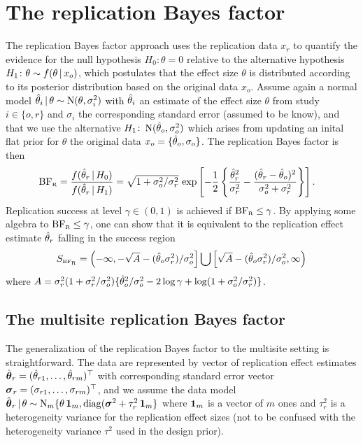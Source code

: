 \documentclass[a4paper, 11pt]{article}
\begin{document}
\section{The replication Bayes factor}
The replication Bayes factor approach uses the replication data $x_{r}$ to
quantify the evidence for the null hypothesis $H_{0}\colon \theta = 0$ relative
to the alternative hypothesis $H_{1} \colon \theta \sim f(\theta \,\vert\, x_{o})$,
which postulates that the effect size $\theta$ is distributed according to its
posterior distribution based on the original data $x_{o}$. Assume again a normal
model $\hat{\theta}_{i} \,\vert\, \theta \sim \operatorname{N}(\theta, \sigma^{2}_{i})$ with
$\hat{\theta}_{i}$ an estimate of the effect size $\theta$ from study $i \in \{o, r\}$
and $\sigma_{i}$ the corresponding standard error (assumed to be know), and that
we use the alternative $H_{1} \colon \operatorname{N}(\hat{\theta}_{o}, \sigma^{2}_{o})$ which
arises from updating an inital flat prior for $\theta$ the original data
$x_{o} = \{\hat{\theta}_{o}, \sigma_{o}\}$. The replication Bayes factor is then
\begin{align}
  \label{eq:bfr}
  \text{BF}_{\scriptscriptstyle \text{R}} &= \frac{f(\hat{\theta}_{r} \,\vert\, H_{0})}{f(\hat{\theta}_{r} \,\vert\, H_{1})}
       = \sqrt{1 + \sigma^{2}_{o}/\sigma^{2}_{r}} \, \exp\left[
         -\frac{1}{2}\left\{ \frac{\hat{\theta}^{2}_{r}}{\sigma^{2}_{r}} -
         \frac{(\hat{\theta}_{r} - \hat{\theta}_{o})^{2}}{\sigma^{2}_{o} + \sigma^{2}_{r}}
         \right\}\right].
\end{align}
Replication success at level $\gamma \in (0, 1)$ is achieved if
$\text{BF}_{\scriptscriptstyle \text{R}} \leq \gamma$. By applying some algebra to $\text{BF}_{\scriptscriptstyle \text{R}} \leq \gamma$, one can show
that it is equivalent to the replication effect estimate $\hat{\theta}_{r}$ falling in
the success region
\begin{align*}
  S_{\scriptscriptstyle \text{BF}_{\scriptscriptstyle \text{R}}}
  = \left(-\infty, -\sqrt{A} - (\hat{\theta}_{o}\sigma^{2}_{r})/\sigma^{2}_{o}\right] \bigcup
   \left[\sqrt{A} - (\hat{\theta}_{o}\sigma^{2}_{r})/\sigma^{2}_{o}, \infty\right)
\end{align*}
where
$A = \sigma^{2}_{r}(1 + \sigma^{2}_{r}/\sigma^{2}_{o}) \{\hat{\theta}_{o}^{2}/\sigma^{2}_{o} - 2 \log \gamma + \log(1 + \sigma^{2}_{o}/\sigma^{2}_{r})\}$.

\subsection{The multisite replication Bayes factor}
The generalization of the replication Bayes factor to the multisite setting is
straightforward. The data are represented by vector of replication effect
estimates $\hat{\boldsymbol{\theta}}_{r} = (\hat{\theta}_{r1}, \dots, \hat{\theta}_{rm})^{\top}$ with
corresponding standard error vector
$\boldsymbol{\sigma}_{r} = (\sigma_{r1}, \dots, \sigma_{rm})^{\top}$, and we assume the data
model
$\hat{\boldsymbol{\theta}}_{r} \,\vert\, \theta \sim \operatorname{N}_{m}\{\theta \, \mathbf{1}_{m}, \operatorname{diag}(\boldsymbol{\sigma}^{2} + \tau^{2}_{r} \, \mathbf{1}_{m}\}$
where $\mathbf{1}_{m}$ is a vector of $m$ ones and $\tau^{2}_{r}$ is a heterogeneity
variance for the replication effect sizes (not to be confused with the
heterogeneity variance $\tau^{2}$ used in the design prior).
\end{document}
